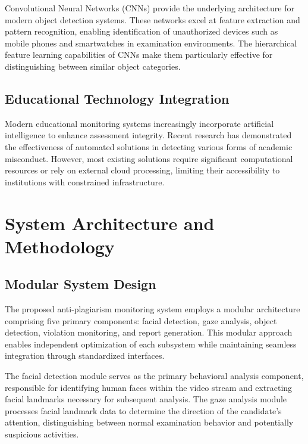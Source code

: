 \documentclass[conference]{IEEEtran}
\begin{document}
Convolutional Neural Networks (CNNs) provide the underlying architecture for modern object 
detection systems\cite{goodfellow2016deep}. These networks excel at feature extraction 
and pattern recognition, enabling identification of unauthorized devices such as mobile 
phones and smartwatches in examination environments. The hierarchical feature learning 
capabilities of CNNs make them particularly effective for distinguishing between similar 
object categories\cite{paszke2019pytorch}.

\subsection{Educational Technology Integration}

Modern educational monitoring systems increasingly incorporate artificial intelligence 
to enhance assessment integrity\cite{russell2020artificial}. Recent research has demonstrated 
the effectiveness of automated solutions in detecting various forms of academic 
misconduct\cite{honorlock2023detecting}. However, most existing solutions require significant 
computational resources or rely on external cloud processing, limiting their accessibility 
to institutions with constrained infrastructure.

\section{System Architecture and Methodology}

\subsection{Modular System Design}

The proposed anti-plagiarism monitoring system employs a modular architecture comprising 
five primary components: facial detection, gaze analysis, object detection, violation 
monitoring, and report generation. This modular approach enables independent optimization 
of each subsystem while maintaining seamless integration through standardized interfaces.

The facial detection module serves as the primary behavioral analysis component, responsible 
for identifying human faces within the video stream and extracting facial landmarks necessary 
for subsequent analysis. The gaze analysis module processes facial landmark data to determine 
the direction of the candidate's attention, distinguishing between normal examination behavior 
and potentially suspicious activities.
\end{document}
